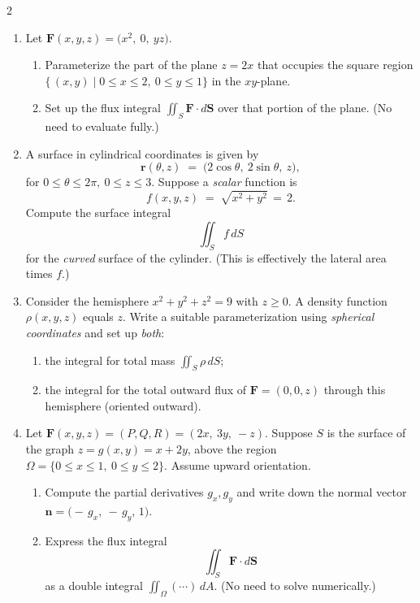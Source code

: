 \begin{multicols}{2}
\begin{enumerate}
\item \enspace
Let
\(\mathbf{F}(x,y,z) = \bigl( x^2,\ 0,\ yz\bigr)\).
\begin{enumerate}
\item Parameterize the part of the plane \(z=2x\) that occupies the square region \(\{\,(x,y) \mid 0\le x\le 2,\ 0\le y\le 1\}\) in the \(xy\)-plane.
\item Set up the flux integral
\(\displaystyle \iint_S \mathbf{F}\cdot d\mathbf{S}\)
over that portion of the plane. (No need to evaluate fully.)
\end{enumerate}

\item \enspace
A surface in cylindrical coordinates is given by
\[
\mathbf{r}(\theta,z) \;=\; \bigl(2\cos\theta,\ 2\sin\theta,\ z\bigr),
\]
for \(0\le \theta \le 2\pi,\ 0\le z \le 3\). Suppose a \emph{scalar} function is
\[
f(x,y,z) \;=\; \sqrt{x^2 + y^2} \,=\, 2.
\]
Compute the surface integral
\[
\iint_S f\,dS
\]
for the \emph{curved} surface of the cylinder. (This is effectively the lateral area times \(f\).)

\item \enspace
Consider the hemisphere \(x^2 + y^2 + z^2 = 9\) with \(z\ge 0\). A density function \(\rho(x,y,z)\) equals \(z\). Write a suitable parameterization using \emph{spherical coordinates} and set up \emph{both}:
\begin{enumerate}
\item the integral for total mass \(\iint_S \rho\,dS\);
\item the integral for the total outward flux of \(\mathbf{F} = (0,0,z)\) through this hemisphere (oriented outward).
\end{enumerate}

\item \enspace
Let \(\mathbf{F}(x,y,z) = (P,Q,R)=(2x,\ 3y,\ -z)\). Suppose \(S\) is the surface of the graph \(z=g(x,y)=x+2y\), above the region \(\Omega=\{0\le x\le1,\ 0\le y\le2\}\). Assume upward orientation.
\begin{enumerate}
\item Compute the partial derivatives \(g_x,g_y\) and write down the normal vector
\(\mathbf{n}=\bigl(-\,g_x,\ -\,g_y,\,1\bigr)\).
\item Express the flux integral 
\[
\iint_S \mathbf{F}\cdot d\mathbf{S}
\]
as a double integral \(\iint_\Omega(\cdots)\,dA\). (No need to solve numerically.)
\end{enumerate}


\end{enumerate}
\end{multicols}
